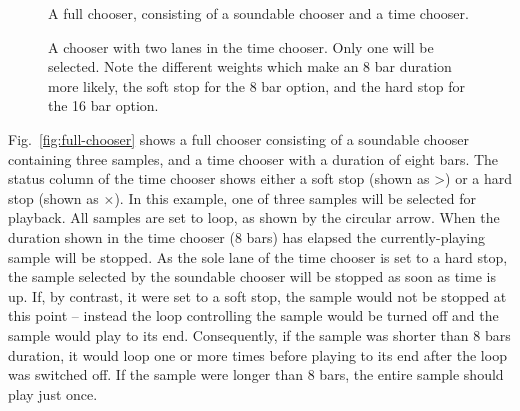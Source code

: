 \documentclass[runningheads,a4paper]{llncs}
\begin{document}
\begin{figure}
	\begin{floatrow}
	{\caption{A full chooser, consisting of a soundable chooser and a time chooser.}\label{fig:full-chooser}}
	{\caption{A chooser with two lanes in the time chooser. Only one will be selected. Note the different weights which make an 8 bar duration more likely, the soft stop for the 8 bar option, and the hard stop for the 16 bar option.}\label{fig:two-time-choosers}}
	\end{floatrow}
\end{figure}


Fig.~\ref{fig:full-chooser} shows a full chooser consisting of a soundable chooser containing three samples, and a time chooser with a duration of eight bars. The status column of the time chooser shows either a soft stop (shown as \textgreater) or a hard stop (shown as $\times$). In this example, one of three samples will be selected for playback. All samples are set to loop, as shown by the circular arrow. When the duration shown in the time chooser (8 bars) has elapsed the currently-playing sample will be stopped. As the sole lane of the time chooser is set to a hard stop, the sample selected by the soundable chooser will be stopped as soon as time is up. If, by contrast, it were set to a soft stop, the sample would not be stopped at this point -- instead the loop controlling the sample would be turned off and the sample would play to its end. Consequently, if the sample was shorter than 8 bars duration, it would loop one or more times before playing to its end after the loop was switched off. If the sample were longer than 8 bars, the entire sample should play just once.
 
\end{document}
